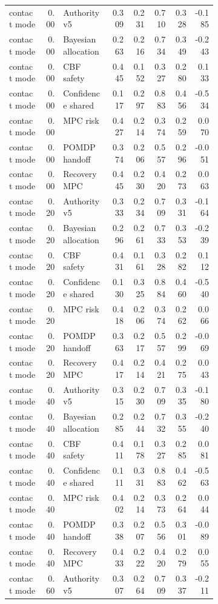 \documentclass{article}
\begin{document}
\begin{center}
\begin{longtable}{p{0.17\linewidth}rp{0.23\linewidth}rrrrr}
contact mode & 0.00 & Authority v5 & 0.309 & 0.231 & 0.710 & 0.328 & -0.185\\
contact mode & 0.00 & Bayesian allocation & 0.263 & 0.216 & 0.734 & 0.349 & -0.243\\
contact mode & 0.00 & CBF safety & 0.445 & 0.152 & 0.327 & 0.280 & 0.133\\
contact mode & 0.00 & Confidence shared & 0.117 & 0.297 & 0.883 & 0.456 & -0.534\\
contact mode & 0.00 & MPC risk & 0.427 & 0.214 & 0.374 & 0.259 & 0.070\\
contact mode & 0.00 & POMDP handoff & 0.374 & 0.206 & 0.557 & 0.296 & -0.051\\
contact mode & 0.00 & Recovery MPC & 0.445 & 0.230 & 0.420 & 0.273 & 0.063\\
contact mode & 0.20 & Authority v5 & 0.333 & 0.234 & 0.709 & 0.331 & -0.164\\
contact mode & 0.20 & Bayesian allocation & 0.296 & 0.261 & 0.733 & 0.353 & -0.239\\
contact mode & 0.20 & CBF safety & 0.431 & 0.161 & 0.328 & 0.282 & 0.112\\
contact mode & 0.20 & Confidence shared & 0.130 & 0.325 & 0.884 & 0.460 & -0.540\\
contact mode & 0.20 & MPC risk & 0.418 & 0.206 & 0.374 & 0.262 & 0.066\\
contact mode & 0.20 & POMDP handoff & 0.363 & 0.217 & 0.557 & 0.299 & -0.069\\
contact mode & 0.20 & Recovery MPC & 0.417 & 0.214 & 0.421 & 0.275 & 0.043\\
contact mode & 0.40 & Authority v5 & 0.315 & 0.230 & 0.709 & 0.335 & -0.180\\
contact mode & 0.40 & Bayesian allocation & 0.285 & 0.244 & 0.732 & 0.355 & -0.240\\
contact mode & 0.40 & CBF safety & 0.411 & 0.178 & 0.327 & 0.285 & 0.081\\
contact mode & 0.40 & Confidence shared & 0.111 & 0.331 & 0.883 & 0.462 & -0.563\\
contact mode & 0.40 & MPC risk & 0.402 & 0.214 & 0.373 & 0.264 & 0.044\\
contact mode & 0.40 & POMDP handoff & 0.338 & 0.207 & 0.556 & 0.301 & -0.089\\
contact mode & 0.40 & Recovery MPC & 0.433 & 0.222 & 0.420 & 0.279 & 0.055\\
contact mode & 0.60 & Authority v5 & 0.307 & 0.264 & 0.709 & 0.337 & -0.211\\

\end{longtable}
\end{center}
\end{document}
